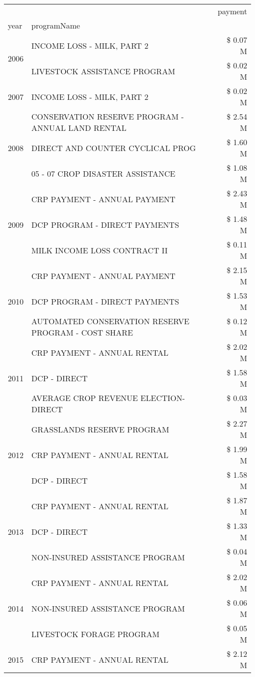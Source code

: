 \begin{tabular}{llr}
\toprule
 &  & payment \\
year & programName &  \\
\midrule
\multirow[t]{2}{*}{2006} & INCOME LOSS - MILK, PART 2 & \$ 0.07 M \\
 & LIVESTOCK ASSISTANCE PROGRAM & \$ 0.02 M \\
\cline{1-3}
2007 & INCOME LOSS - MILK, PART 2 & \$ 0.02 M \\
\cline{1-3}
\multirow[t]{3}{*}{2008} & CONSERVATION RESERVE PROGRAM - ANNUAL LAND RENTAL & \$ 2.54 M \\
 & DIRECT AND COUNTER CYCLICAL PROG & \$ 1.60 M \\
 & 05 - 07 CROP DISASTER ASSISTANCE & \$ 1.08 M \\
\cline{1-3}
\multirow[t]{3}{*}{2009} & CRP PAYMENT - ANNUAL PAYMENT & \$ 2.43 M \\
 & DCP PROGRAM - DIRECT PAYMENTS & \$ 1.48 M \\
 & MILK INCOME LOSS CONTRACT II & \$ 0.11 M \\
\cline{1-3}
\multirow[t]{3}{*}{2010} & CRP PAYMENT - ANNUAL PAYMENT & \$ 2.15 M \\
 & DCP PROGRAM - DIRECT PAYMENTS & \$ 1.53 M \\
 & AUTOMATED CONSERVATION RESERVE PROGRAM - COST SHARE & \$ 0.12 M \\
\cline{1-3}
\multirow[t]{3}{*}{2011} & CRP PAYMENT - ANNUAL RENTAL & \$ 2.02 M \\
 & DCP - DIRECT & \$ 1.58 M \\
 & AVERAGE CROP REVENUE ELECTION-DIRECT & \$ 0.03 M \\
\cline{1-3}
\multirow[t]{3}{*}{2012} & GRASSLANDS RESERVE PROGRAM & \$ 2.27 M \\
 & CRP PAYMENT - ANNUAL RENTAL & \$ 1.99 M \\
 & DCP - DIRECT & \$ 1.58 M \\
\cline{1-3}
\multirow[t]{3}{*}{2013} & CRP PAYMENT - ANNUAL RENTAL & \$ 1.87 M \\
 & DCP - DIRECT & \$ 1.33 M \\
 & NON-INSURED ASSISTANCE PROGRAM & \$ 0.04 M \\
\cline{1-3}
\multirow[t]{3}{*}{2014} & CRP PAYMENT - ANNUAL RENTAL & \$ 2.02 M \\
 & NON-INSURED ASSISTANCE PROGRAM & \$ 0.06 M \\
 & LIVESTOCK FORAGE PROGRAM & \$ 0.05 M \\
\cline{1-3}
\multirow[t]{3}{*}{2015} & CRP PAYMENT - ANNUAL RENTAL & \$ 2.12 M \\

\end{tabular}

